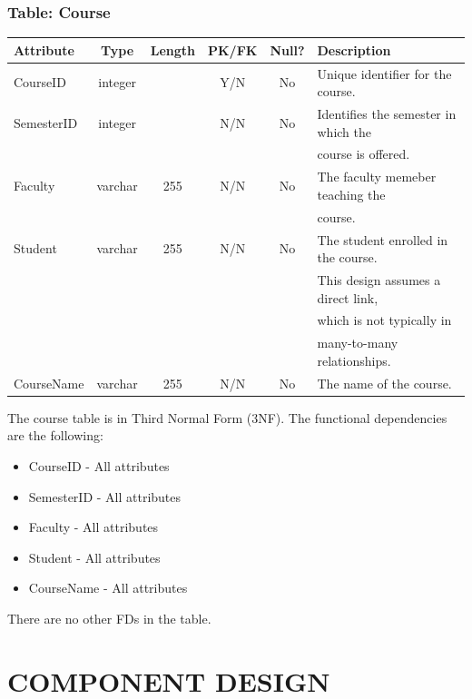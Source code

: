 \documentclass[letterpaper,12pt,oneside,listof=totoc]{scrreprt}
\begin{document}
\subsection{Table: Course}
\begin{table}[h]
    \centering
    \begin{tabular}{|l|c|c|c|c|l|}
        \hline
        \textbf{Attribute} & \textbf{Type} & \textbf{Length} & \textbf{PK/FK} & \textbf{Null?} & \textbf{Description}
        \\
        \hline
         CourseID & integer &  & Y/N & No & Unique identifier for the course.
        \\
        \hline
        SemesterID & integer &  & N/N & No & Identifies the semester in which the \\ &&&&& course is offered.
        \\
        \hline
        Faculty & varchar & 255 & N/N & No & The faculty memeber teaching the \\ &&&&& course.
        \\
        \hline
        Student & varchar & 255 & N/N & No & The student enrolled in the course. \\ &&&&& This design assumes a direct link, \\ &&&&& which is not typically in \\ &&&&& many-to-many relationships.
        \\
        \hline
        CourseName & varchar & 255 & N/N & No & The name of the course.
        \\
        \hline
    \end{tabular}
\end{table}

The course table is in Third Normal Form (3NF). The functional dependencies are the following:
\begin{itemize}
  \item CourseID - All attributes
  \item SemesterID - All attributes
  \item Faculty - All attributes
  \item Student - All attributes
  \item CourseName - All attributes
\end{itemize}
There are no other FDs in the table.

\chapter{COMPONENT DESIGN}
\end{document}
